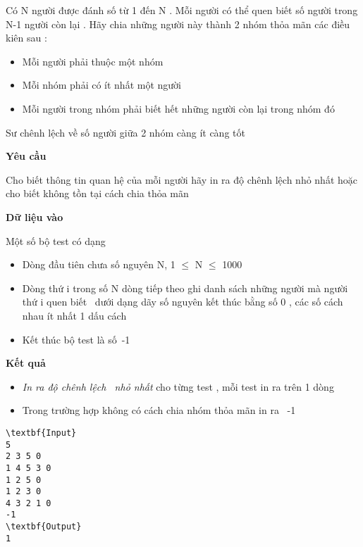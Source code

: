 

Có N người được đánh số từ 1 đến N . Mỗi người có thể quen biết số người trong N-1 người còn lại . Hãy chia những người này thành 2 nhóm thỏa mãn các điều kiên sau :
\begin{itemize}
	\item Mỗi người phải thuộc một nhóm
	\item Mỗi nhóm phải có ít nhất một người
	\item Mỗi người trong nhóm phải biết hết những người còn lại trong nhóm đó
\end{itemize}

Sư chênh lệch về số người giữa 2 nhóm càng ít càng tốt

\textbf{Yêu cầu}

Cho biết thông tin quan hệ của mỗi người hãy in ra độ chênh lệch nhỏ nhất hoặc cho biết không tồn tại cách chia thỏa mãn

\textbf{Dữ liệu vào}

Một số bộ test có dạng
\begin{itemize}
	\item Dòng đầu tiên chưa số nguyên N, 1  $\le$  N  $\le$  1000
	\item Dòng thứ i trong số N dòng tiếp theo ghi danh sách những người mà người thứ i quen biết  dưới dạng dãy số nguyên kết thúc bằng số 0 , các số cách nhau ít nhất 1 dấu cách
	\item Kết thúc bộ test là số -1
\end{itemize}

\textbf{Kết quả }
\begin{itemize}
	\item \emph{In ra độ chênh lệch  nhỏ nhất } cho từng test , mỗi test in ra trên 1 dòng
	\item Trong trường hợp không có cách chia nhóm thỏa mãn in ra  -1
\end{itemize}
\begin{verbatim}
\textbf{Input}
5
2 3 5 0
1 4 5 3 0
1 2 5 0
1 2 3 0
4 3 2 1 0
-1
\textbf{Output}
1\end{verbatim}
